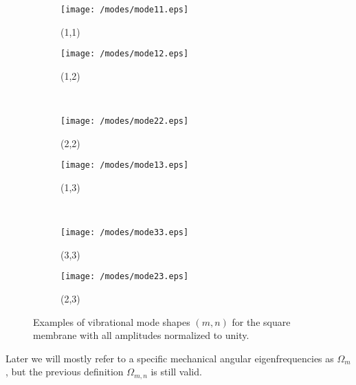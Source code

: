 \begin{figure}[H]
    \centering
    \begin{subfigure}[b]{0.49\textwidth}
        \centering
        \texttt{[image: /modes/mode11.eps]}
        \caption*{(1,1)}
    \end{subfigure}
    \hfil
    \begin{subfigure}[b]{0.49\textwidth}
        \centering
        \texttt{[image: /modes/mode12.eps]}
        \caption*{(1,2)}
    \end{subfigure}\\
    \begin{subfigure}[b]{0.49\textwidth}
        \centering
        \texttt{[image: /modes/mode22.eps]}
        \caption*{(2,2)}
    \end{subfigure}
    \hfil
    \begin{subfigure}[b]{0.49\textwidth}
        \centering
        \texttt{[image: /modes/mode13.eps]}
        \caption*{(1,3)}
    \end{subfigure}\\
        \begin{subfigure}[b]{0.49\textwidth}
        \centering
        \texttt{[image: /modes/mode33.eps]}
        \caption*{(3,3)}
    \end{subfigure}
    \hfil
    \begin{subfigure}[b]{0.49\textwidth}
        \centering
        \texttt{[image: /modes/mode23.eps]}
        \caption*{(2,3)}
    \end{subfigure}
\caption{Examples of vibrational mode shapes $(m, n)$ for the square membrane with all amplitudes normalized to unity.}
\label{fig:modeshape}
\end{figure}

Later we will mostly refer to a specific mechanical angular eigenfrequencies as $\Omega_m$, but the previous definition $\Omega_{m,n}$ is still valid.